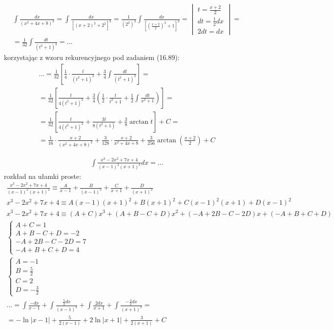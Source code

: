 
\begin{gather*}\int \frac{dx}{(x^2+4x+8)^3} = \int \frac{dx}{[(x+2)^2+2^2]^3} = \frac{1}{(2^2)^3} \int \frac{dx}{\left[\left( \frac{x+2}{2} \right)^2 + 1\right]^3} = \begin{vmatrix} t=\frac{x+2}{2} \\ dt=\frac{1}{2}dx \\ 2dt=dx \end{vmatrix} = \\
= \frac{1}{32} \int \frac{dt}{(t^2+1)^3}=\ldots\end{gather*}
korzystając z wzoru rekurencyjnego pod zadaniem (16.89):
\begin{gather*}\ldots = \frac{1}{32} \left[ \frac{1}{4}\cdot \frac{t}{(t^2+1)^2} + \frac{3}{4}\int \frac{dt}{(t^2+1)^2} \right] = \\= \frac{1}{32} \left[ \frac{t}{4(t^2+1)^2} + \frac{3}{4} \left( \frac{1}{2} \cdot \frac{t}{t^2+1} + \frac{1}{2} \int \frac{dt}{x^2+1} \right) \right]  = \\
= \frac{1}{32} \left[ \frac{t}{4(t^2+1)^2} + \frac{3t}{8(t^2+1)} + \frac{3}{8}\arctan t \right] +C = \\
= \frac{1}{16} \cdot \frac{x+2}{(x^2+4x+8)^2} + \frac{3}{128} \cdot \frac{x+2}{x^2+4x+8} + \frac{3}{256} \arctan \left( \frac{x+2}{2} \right)+C\end{gather*}



\begin{gather*}\int \frac{x^3-2x^2+7x+4}{(x-1)^2(x+1)^2}dx=\ldots\end{gather*}
rozkład na ułamki proste:
\begin{gather*}\frac{x^3-2x^2+7x+4}{(x-1)^2(x+1)^2} \equiv \frac{A}{x-1}+\frac{B}{(x-1)^2}+\frac{C}{x+1}+\frac{D}{(x+1)^2} \\
x^3-2x^2+7x+4 \equiv A(x-1)(x+1)^2+B(x+1)^2+C(x-1)^2(x+1)+D(x-1)^2 \\
x^3-2x^2+7x+4 \equiv (A+C)x^3+(A+B-C+D)x^2+(-A+2B-C-2D)x+(-A+B+C+D) \\
\begin{cases} A+C=1 \\ A+B-C+D=-2 \\ -A+2B-C-2D=7 \\ -A+B+C+D=4 \end{cases} \\
\begin{cases} A=-1 \\ B=\frac{5}{2} \\ C=2 \\ D=-\frac{3}{2} \end{cases} \\
\ldots = \int \frac{-dx}{x-1}+\int \frac{\frac{5}{2}dx}{(x-1)^2}+\int \frac{2dx}{x+1}+\int \frac{-\frac{3}{2}dx}{(x+1)^2} = \\
= -\ln|x-1|+\frac{5}{2(x-1)}+2\ln|x+1|+\frac{3}{2(x+1)}+C\end{gather*}



